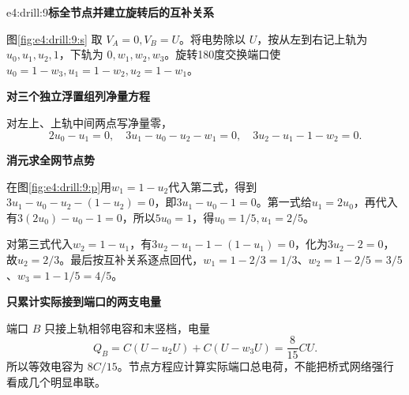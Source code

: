 \begin{drillsolution}{e4:drill:9}\textbf{标全节点并建立旋转后的互补关系}\par\nobreak
图\ref{fig:e4:drill:9:s} 取 $V_A=0,V_B=U$。将电势除以 $U$，按从左到右记上轨为 $u_0,u_1,u_2,1$，下轨为 $0,w_1,w_2,w_3$。旋转180度交换端口使 $u_0=1-w_3,u_1=1-w_2,u_2=1-w_1$。

\par\medskip{}\noindent\textbf{对三个独立浮置组列净量方程}\par\nobreak
对左上、上轨中间两点写净量零，
\[
 2u_0-u_1=0,\quad3u_1-u_0-u_2-w_1=0,\quad
 3u_2-u_1-1-w_2=0.
\]



\par\medskip{}\noindent\textbf{消元求全网节点势}\par\nobreak
在图\ref{fig:e4:drill:9:p}用$w_1=1-u_2$代入第二式，得到$3u_1-u_0-u_2-(1-u_2)=0$，即$3u_1-u_0-1=0$。第一式给$u_1=2u_0$，再代入有$3(2u_0)-u_0-1=0$，所以$5u_0=1$，得$u_0=1/5,u_1=2/5$。

对第三式代入$w_2=1-u_1$，有$3u_2-u_1-1-(1-u_1)=0$，化为$3u_2-2=0$，故$u_2=2/3$。最后按互补关系逐点回代，$w_1=1-2/3=1/3$、$w_2=1-2/5=3/5$、$w_3=1-1/5=4/5$。

\par\medskip{}\noindent\textbf{只累计实际接到端口的两支电量}\par\nobreak
端口 $B$ 只接上轨相邻电容和末竖档，电量
\[
 Q_B=C(U-u_2U)+C(U-w_3U)=\frac8{15}CU.
\]
所以等效电容为 $8C/15$。节点方程应计算实际端口总电荷，不能把桥式网络强行看成几个明显串联。\end{drillsolution}
